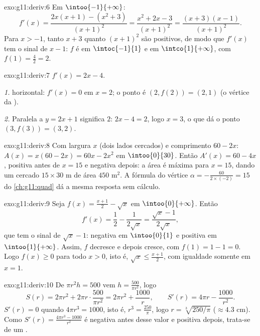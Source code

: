 \begin{solution}{exo:g11:deriv:6}
Em $\intoo{-1}{+\infty}$:
\[
f'(x) = \frac{2x(x+1) - (x^2+3)}{(x+1)^2}
= \frac{x^2 + 2x - 3}{(x+1)^2}
= \frac{(x+3)(x-1)}{(x+1)^2}.
\]
Para $x > -1$, tanto $x + 3$ quanto $(x+1)^2$ são positivos, de modo que
$f'(x)$ tem o sinal de $x - 1$: $f$ é  em $\intoc{-1}{1}$ e
 em $\intco{1}{+\infty}$, com 
$f(1) = \frac{4}{2} = 2$.
\end{solution}

\begin{solution}{exo:g11:deriv:7}
$f'(x) = 2x - 4$.

\emph{1.}  horizontal: $f'(x) = 0$ em $x = 2$; o ponto é
$(2, f(2)) = (2, 1)$ (o vértice da ).

\emph{2.} Paralela a $y = 2x + 1$ significa  $2$:
$2x - 4 = 2$, logo $x = 3$, o que dá o ponto $(3, f(3)) = (3, 2)$.
\end{solution}

\begin{solution}{exo:g11:deriv:8}
Com largura $x$ (dois lados cercados) e comprimento $60 - 2x$:
$A(x) = x(60 - 2x) = 60x - 2x^2$ em $\intoo{0}{30}$. Então
$A'(x) = 60 - 4x$, positiva antes de $x = 15$ e negativa depois: a área é
máxima para $x = 15$, dando um cercado $15 \times 30$ m de área
$450$ m$^2$. A fórmula do vértice
$\alpha = -\frac{60}{2 \times (-2)} = 15$ do \cref{ch:g11:quad} dá a
mesma resposta sem cálculo.
\end{solution}

\begin{solution}{exo:g11:deriv:9}
Seja $f(x) = \frac{x+1}{2} - \sqrt x$ em $\intoo{0}{+\infty}$. Então
\[
f'(x) = \frac12 - \frac{1}{2\sqrt x} = \frac{\sqrt x - 1}{2\sqrt x},
\]
que tem o sinal de $\sqrt x - 1$: negativa em $\intoo{0}{1}$ e positiva
em $\intoo{1}{+\infty}$. Assim, $f$ decresce e depois cresce, com 
$f(1) = 1 - 1 = 0$. Logo $f(x) \geq 0$ para todo $x > 0$, isto é,
$\sqrt x \leq \frac{x+1}{2}$, com igualdade somente em $x = 1$.
\end{solution}

\begin{solution}{exo:g11:deriv:10}
De $\pi r^2 h = 500$ vem $h = \frac{500}{\pi r^2}$, logo
\[
S(r) = 2\pi r^2 + 2\pi r \cdot \frac{500}{\pi r^2}
= 2\pi r^2 + \frac{1000}{r},
\qquad
S'(r) = 4\pi r - \frac{1000}{r^2}.
\]
$S'(r) = 0$ quando $4\pi r^3 = 1000$, isto é,
$r^3 = \frac{250}{\pi}$, logo $r = \sqrt[3]{250/\pi}$
($\approx 4.3$ cm). Como
$S'(r) = \frac{4\pi r^3 - 1000}{r^2}$ é negativa antes desse valor e
positiva depois, trata-se de um .
\end{solution}


